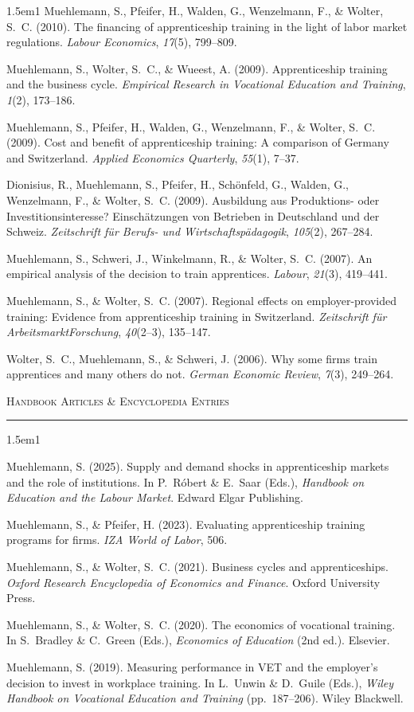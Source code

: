 \documentclass[11pt,a4paper]{article}
\newcommand{\cvsection}[1]{%
  \vspace{1.1em}%
  {\large\textsc{#1}}\par
  \vspace{0.15em}\hrule\vspace{0.65em}%
}
\begin{document}
\begin{hangparas}{1.5em}{1}
Muehlemann, S., Pfeifer, H., Walden, G., Wenzelmann, F., \& Wolter, S.~C. (2010). The financing of apprenticeship training in the light of labor market regulations. \textit{Labour Economics}, \textit{17}(5), 799--809.

Muehlemann, S., Wolter, S.~C., \& Wueest, A. (2009). Apprenticeship training and the business cycle. \textit{Empirical Research in Vocational Education and Training}, \textit{1}(2), 173--186.

Muehlemann, S., Pfeifer, H., Walden, G., Wenzelmann, F., \& Wolter, S.~C. (2009). Cost and benefit of apprenticeship training: A comparison of Germany and Switzerland. \textit{Applied Economics Quarterly}, \textit{55}(1), 7--37.

Dionisius, R., Muehlemann, S., Pfeifer, H., Sch\"onfeld, G., Walden, G., Wenzelmann, F., \& Wolter, S.~C. (2009). Ausbildung aus Produktions- oder Investitionsinteresse? Einsch\"atzungen von Betrieben in Deutschland und der Schweiz. \textit{Zeitschrift f\"ur Berufs- und Wirtschaftsp\"adagogik}, \textit{105}(2), 267--284.

Muehlemann, S., Schweri, J., Winkelmann, R., \& Wolter, S.~C. (2007). An empirical analysis of the decision to train apprentices. \textit{Labour}, \textit{21}(3), 419--441.

Muehlemann, S., \& Wolter, S.~C. (2007). Regional effects on employer-provided training: Evidence from apprenticeship training in Switzerland. \textit{Zeitschrift f\"ur ArbeitsmarktForschung}, \textit{40}(2--3), 135--147.

Wolter, S.~C., Muehlemann, S., \& Schweri, J. (2006). Why some firms train apprentices and many others do not. \textit{German Economic Review}, \textit{7}(3), 249--264.

\end{hangparas}

\cvsection{Handbook Articles \& Encyclopedia Entries}

\begin{hangparas}{1.5em}{1}

Muehlemann, S. (2025). Supply and demand shocks in apprenticeship markets and the role of institutions. In P.~R\'obert \& E.~Saar (Eds.), \textit{Handbook on Education and the Labour Market}. Edward Elgar Publishing.

Muehlemann, S., \& Pfeifer, H. (2023). Evaluating apprenticeship training programs for firms. \textit{IZA World of Labor}, 506.

Muehlemann, S., \& Wolter, S.~C. (2021). Business cycles and apprenticeships. \textit{Oxford Research Encyclopedia of Economics and Finance}. Oxford University Press.

Muehlemann, S., \& Wolter, S.~C. (2020). The economics of vocational training. In S.~Bradley \& C.~Green (Eds.), \textit{Economics of Education} (2nd ed.). Elsevier.

Muehlemann, S. (2019). Measuring performance in VET and the employer's decision to invest in workplace training. In L.~Unwin \& D.~Guile (Eds.), \textit{Wiley Handbook on Vocational Education and Training} (pp.~187--206). Wiley Blackwell.

\end{hangparas}
\end{document}
